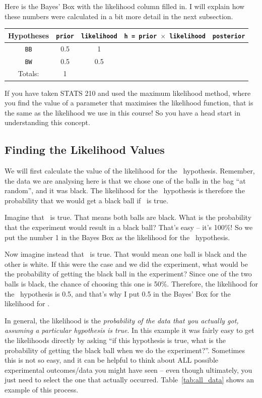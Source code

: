 Here is the Bayes' Box with the likelihood column filled in. I will explain
how these numbers were calculated in a bit more detail in the next subsection.
\begin{table}[!ht]
\begin{center}
\begin{tabular}{|c|c|c|c|c|}
\hline
{\bf Hypotheses} & {\tt prior} & {\tt likelihood} &
{\tt h = prior $\times$ likelihood} & {\tt posterior}\\
\hline
{\tt BB} & 0.5 & 1 &  & \\
{\tt BW} & 0.5 & 0.5 &  & \\
\hline
Totals: & 1 & & & \\
\hline
\end{tabular}
\end{center}
\end{table}
If you have taken STATS 210 and used the maximum likelihood method, where you
find the value of a parameter that maximises the likelihood function, that is
the same as the likelihood we use in this course! So you have a head start
in understanding this concept.

\subsection{Finding the Likelihood Values}
We will first calculate the value of the likelihood for the \bb~hypothesis.
Remember, the data we are analysing here is that we chose one of the balls in
the bag ``at random'', and it was black. The likelihood for the \bb~hypothesis is
therefore the probability that we would get a black ball if \bb~is true.

Imagine that \bb~is true. That means both balls are black. What is the probability that
the experiment would result in a black ball? That's easy -- it's 100\%! So we
put the number 1 in the Bayes Box as the likelihood for the \bb~hypothesis.

Now imagine instead that \bw~is true. That would mean one ball is black and the
other is white. If this were the case and we did the experiment, what would be
the probability of getting the black ball in the experiment? Since one of the
two balls is black, the chance of choosing this one is 50\%. Therefore, the
likelihood for the \bw~hypothesis is 0.5, and that's why I put 0.5 in the Bayes'
Box for the likelihood for \bw.

In general, the likelihood is the {\it probability of the data that you actually
got, assuming a particular hypothesis is true}. In this example it was
fairly easy to get the likelihoods directly by asking ``if this hypothesis
is true, what is the probability of getting the black ball when we do the
experiment?''. Sometimes this is not so easy, and it can be helpful to think about
ALL possible experimental outcomes/data you might have seen -- even though
ultimately, you just need to select the one that actually occurred.
Table~\ref{tab:all_data} shows an example of this process.

